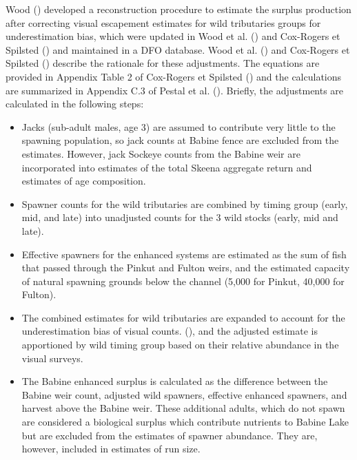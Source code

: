 \documentclass[french,11pt]{book}
\begin{document}
Wood () developed a reconstruction procedure to estimate the surplus production after correcting visual escapement estimates for wild tributaries groups for underestimation bias, which were updated in Wood et al. () and Cox-Rogers et Spilsted () and maintained in a DFO database. Wood et al. () and Cox-Rogers et Spilsted () describe the rationale for these adjustments. The equations are provided in Appendix Table 2 of Cox-Rogers et Spilsted () and the calculations are summarized in Appendix C.3 of Pestal et al. (). Briefly, the adjustments are calculated in the following steps:
\begin{itemize}

\item
  Jacks (sub-adult males, age 3) are assumed to contribute very little to the spawning population, so jack counts at Babine fence are excluded from the estimates. However, jack Sockeye counts from the Babine weir are incorporated into estimates of the total Skeena aggregate return and estimates of age composition.
\item
  Spawner counts for the wild tributaries are combined by timing group (early, mid, and late) into unadjusted counts for the 3 wild stocks (early, mid and late).
\item
  Effective spawners for the enhanced systems are estimated as the sum of fish that passed through the Pinkut and Fulton weirs, and the estimated capacity of natural spawning grounds below the channel (5,000 for Pinkut, 40,000 for Fulton).
\item
  The combined estimates for wild tributaries are expanded to account for the underestimation bias of visual counts. (), and the adjusted estimate is apportioned by wild timing group based on their relative abundance in the visual surveys.
\item
  The Babine enhanced surplus is calculated as the difference between the Babine weir count, adjusted wild spawners, effective enhanced spawners, and harvest above the Babine weir. These additional adults, which do not spawn are considered a biological surplus which contribute nutrients to Babine Lake but are excluded from the estimates of spawner abundance. They are, however, included in estimates of run size.
\end{itemize}
\end{document}
